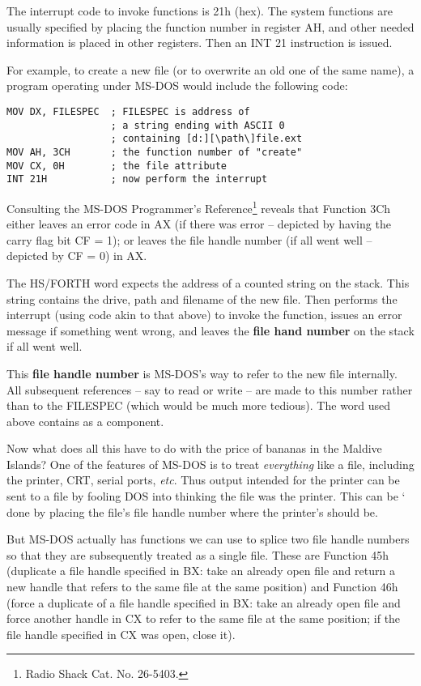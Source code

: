 The interrupt code to invoke functions is 21h (hex).
The system functions are usually specified by placing the function number in register AH, and other needed information is placed in other registers.
Then an INT 21 instruction is issued.

For example, to create a new file (or to overwrite an old one of the same name), a program operating under MS-DOS would include the following code:

\begin{lstlisting}
MOV DX, FILESPEC  ; FILESPEC is address of
                  ; a string ending with ASCII 0
                  ; containing [d:][\path\]file.ext
MOV AH, 3CH       ; the function number of "create"
MOV CX, 0H        ; the file attribute
INT 21H           ; now perform the interrupt
\end{lstlisting}

Consulting the MS-DOS Programmer's Reference\footnote{Radio Shack Cat. No. 26-5403.} reveals that Function 3Ch either leaves an error code in AX (if there was error -- depicted by having the carry flag bit CF = 1); or leaves the file handle number (if all went well -- depicted by CF = 0) in AX.

The HS/FORTH word  expects the address of a counted string on the stack.
This string contains the drive, path and filename of the new file.
Then  performs the interrupt (using code akin to that above) to invoke the function, issues an error message if something went wrong, and leaves the \textbf{file hand number} on the stack if all went well.

This \textbf{file handle number} is MS-DOS's way to refer to the new file internally.
All subsequent references -- say to read or write -- are made to this number rather than to the FILESPEC (which would be much more tedious).
The word  used above contains  as a component.

Now what does all this have to do with the price of bananas in the Maldive Islands?
One of the features of MS-DOS is to treat \textit{everything} like a file, including the printer, CRT, serial ports, \textit{etc}.
Thus output intended for the printer can be sent to a file by fooling DOS into thinking the file was the printer.
This can be ‘ done by placing the file’s file handle number where the printer’s should be.

But MS-DOS actually has functions we can use to splice two file handle numbers so that they are subsequently treated as a single file.
These are Function 45h (duplicate a file handle specified in BX: take an already open file and return a new handle that refers to the same file at the same position) and Function 46h (force a duplicate of a file handle specified in BX: take an already open file and force another handle in CX to refer to the same file at the same position; if the file handle specified in CX was open, close it).

